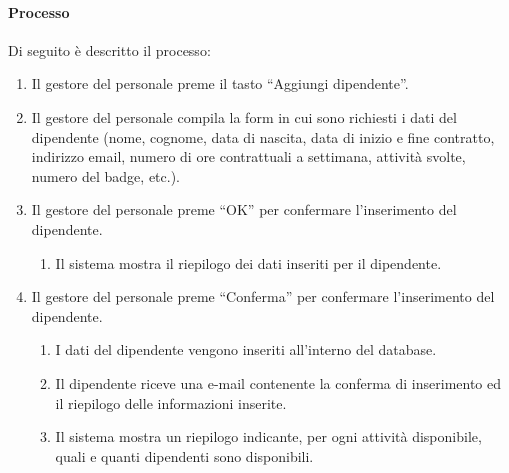 \paragraph{Processo}
Di seguito è descritto il processo:
\begin{enumerate}
	\item Il gestore del personale preme il tasto “Aggiungi dipendente”.
	\item Il gestore del personale compila la form in cui sono richiesti i dati del dipendente (nome, cognome, data di nascita, data di inizio e fine contratto, indirizzo email, numero di ore contrattuali a settimana, attività svolte, numero del badge, etc.). 	
	\item Il gestore del personale preme “OK” per confermare l’inserimento del dipendente.
		\begin{enumerate}
			\item Il sistema mostra il riepilogo dei dati inseriti per il dipendente.
		\end{enumerate}
	\item Il gestore del personale preme “Conferma” per confermare l’inserimento del dipendente.
		\begin{enumerate}
			\item I dati del dipendente vengono inseriti all’interno del database.
			\item Il dipendente riceve una e-mail contenente la conferma di inserimento ed il riepilogo delle informazioni inserite.
			\item Il sistema mostra un riepilogo indicante, per ogni attività disponibile, quali e quanti dipendenti sono disponibili.
		\end{enumerate}
\end{enumerate}
